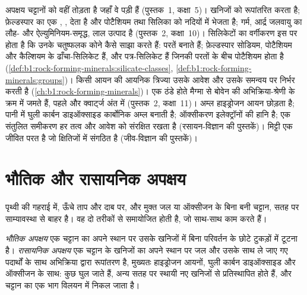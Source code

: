 \begin{recall}
अपक्षय चट्टानों को वहीं तोड़ता है जहाँ वे पड़ी हैं (पुस्तक~1, कक्षा~5)।  खनिजों को रूपांतरित करता है; फ़ेल्डस्पार का  एक , , देता है और पोटैशियम तथा सिलिका को नदियों में भेजता है;  गर्म, आर्द्र जलवायु का लौह- और ऐल्युमिनियम-समृद्ध, लाल उत्पाद है (पुस्तक~2, कक्षा~10)। सिलिकेटों का वर्गीकरण इस पर होता है कि उनके  चतुष्फलक कोने कैसे साझा करते हैं:  परतें बनाते हैं; फ़ेल्डस्पार सोडियम, पोटैशियम और कैल्शियम के ढाँचा-सिलिकेट हैं, और  पत्र-सिलिकेट हैं जिनकी परतों के बीच पोटैशियम होता है (\cref{def:b1:rock-forming-minerals:silicate-classes}, \cref{def:b1:rock-forming-minerals:groups})। किसी आयन की आयनिक त्रिज्या उसके आवेश और उसके समन्वय पर निर्भर करती है (\cref{ch:b1:rock-forming-minerals})।  एक ठंडे होते मैग्मा से बोवेन की अभिक्रिया-श्रेणी के क्रम में जमते हैं,  पहले और क्वार्ट्ज अंत में (पुस्तक~2, कक्षा~11)। अम्ल हाइड्रोजन आयन छोड़ता है; पानी में घुली कार्बन डाइऑक्साइड कार्बोनिक अम्ल बनाती है; ऑक्सीकरण इलेक्ट्रॉनों की हानि है; एक संतुलित समीकरण हर तत्व और आवेश को संरक्षित रखता है (रसायन-विज्ञान की पुस्तकें)। मिट्टी एक जीवित परत है जो क्षितिजों में संगठित है (जीव-विज्ञान की पुस्तकें)।
\end{recall}

\section{भौतिक और रासायनिक अपक्षय}\label{sec:b1:weathering-clays:types}

पृथ्वी की गहराई में, ऊँचे ताप और दाब पर, और मुक्त जल या ऑक्सीजन के बिना बनी चट्टान, सतह पर साम्यावस्था से बाहर है। वह दो तरीकों से समायोजित होती है, जो साथ-साथ काम करते हैं।

\begin{definition}
\label{def:b1:weathering-clays:weathering}
\emph{भौतिक अपक्षय} एक चट्टान का अपने स्थान पर उसके खनिजों में बिना परिवर्तन के छोटे टुकड़ों में टूटना है। \emph{रासायनिक अपक्षय} एक चट्टान के खनिजों का अपने स्थान पर जल और उसके साथ ले जाए गए पदार्थों के साथ अभिक्रिया द्वारा रूपांतरण है, मुख्यतः हाइड्रोजन आयनों, घुली कार्बन डाइऑक्साइड और ऑक्सीजन के साथ: कुछ  घुल जाते हैं, अन्य सतह पर स्थायी नए खनिजों से प्रतिस्थापित होते हैं, और चट्टान का एक भाग विलयन में निकल जाता है।
\end{definition}

